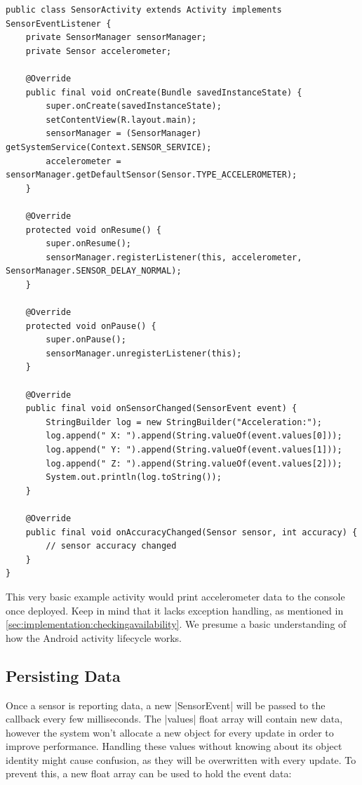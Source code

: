 \begin{lstlisting}[label=basicactivity]
public class SensorActivity extends Activity implements SensorEventListener {
	private SensorManager sensorManager;
	private Sensor accelerometer;

	@Override
	public final void onCreate(Bundle savedInstanceState) {
		super.onCreate(savedInstanceState);
		setContentView(R.layout.main);
		sensorManager = (SensorManager) getSystemService(Context.SENSOR_SERVICE);
		accelerometer = sensorManager.getDefaultSensor(Sensor.TYPE_ACCELEROMETER);
	}

	@Override
	protected void onResume() {
		super.onResume();
		sensorManager.registerListener(this, accelerometer, SensorManager.SENSOR_DELAY_NORMAL);
	}

	@Override
	protected void onPause() {
		super.onPause();
		sensorManager.unregisterListener(this);
	}

	@Override
	public final void onSensorChanged(SensorEvent event) {
		StringBuilder log = new StringBuilder("Acceleration:");
		log.append(" X: ").append(String.valueOf(event.values[0]));
		log.append(" Y: ").append(String.valueOf(event.values[1]));
		log.append(" Z: ").append(String.valueOf(event.values[2]));
		System.out.println(log.toString());
	}

	@Override
	public final void onAccuracyChanged(Sensor sensor, int accuracy) {
		// sensor accuracy changed
	}
}
\end{lstlisting}

This very basic example activity would print accelerometer data to the console once deployed.
Keep in mind that it lacks exception handling, as mentioned in \ref{sec:implementation:checkingavailability}.
We presume a basic understanding of how the Android activity\cite{androiddocs:activity} lifecycle works.

\subsection{Persisting Data}
Once a sensor is reporting data, a new |SensorEvent| will be passed to the callback every few milliseconds.
The |values| float array will contain new data, however the system won't allocate a new object for every update in order to improve performance.
Handling these values without knowing about its object identity might cause confusion, as they will be overwritten with every update.
To prevent this, a new float array can be used to hold the event data:


